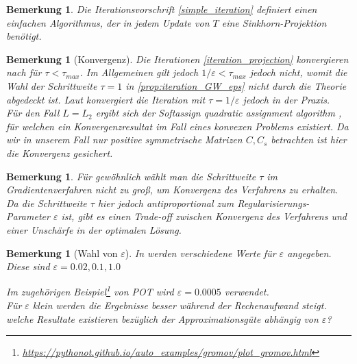 \documentclass[11pt,a4paper]{article}
\newtheorem{remark}[theorem]{Bemerkung}
\numberwithin{equation}{section}
\begin{document}
	\begin{remark}
		Die Iterationsvorschrift \ref{simple_iteration} definiert einen einfachen Algorithmus, der in jedem Update von $T$ eine Sinkhorn-Projektion benötigt.
	\end{remark}
	
	\begin{remark}[Konvergenz]
		Die Iterationen \autoref{iteration_projection} konvergieren nach \cite{boct2016inertial} für $\tau < \tau_{max}$. Im Allgemeinen gilt jedoch $1/\varepsilon < \tau_{max}$ jedoch nicht, womit die Wahl der Schrittweite $\tau = 1 $ in \autoref{prop:iteration_GW_eps} nicht durch die Theorie abgedeckt ist. Laut \cite{gwd_averaging_kernels} konvergiert die Iteration mit $\tau = 1/\varepsilon$ jedoch in der Praxis.\\
		Für den Fall $L=L_2$ ergibt sich der \glqq \textit{Softassign quadratic assignment algorithm} \glqq{} \cite{rangarajan1999convergence}, für welchen ein Konvergenzresultat im Fall eines konvexen Problems existiert. Da wir in unserem Fall nur positive symmetrische Matrizen $C,C_s$ betrachten ist hier die Konvergenz gesichert.
	\end{remark}
	
	
	
	\begin{remark}
		Für gewöhnlich wählt man die Schrittweite $ \tau$ im Gradientenverfahren nicht zu groß, um Konvergenz des Verfahrens zu erhalten. Da die Schrittweite $\tau$ hier jedoch antiproportional zum Regularisierungs-Parameter $\varepsilon$ ist, gibt es einen Trade-off zwischen Konvergenz des Verfahrens und einer Unschärfe in der optimalen Lösung. 
	\end{remark}
	
	\begin{remark}[Wahl von $\varepsilon$]
		In \cite{cuturi2013sinkhorn} werden verschiedene Werte für $\varepsilon$ angegeben. Diese sind $\varepsilon = 0.02, 0.1, 1.0$
		
		Im zugehörigen Beispiel\footnote{\url{https://pythonot.github.io/auto_examples/gromov/plot_gromov.html}} von POT wird $\varepsilon = 0.0005$ verwendet. \\
		Für $\varepsilon$ klein werden die Ergebnisse besser während der Rechenaufwand steigt.\\
		welche Resultate existieren bezüglich der Approximationsgüte abhängig von $\varepsilon$?
	\end{remark}
\end{document}
